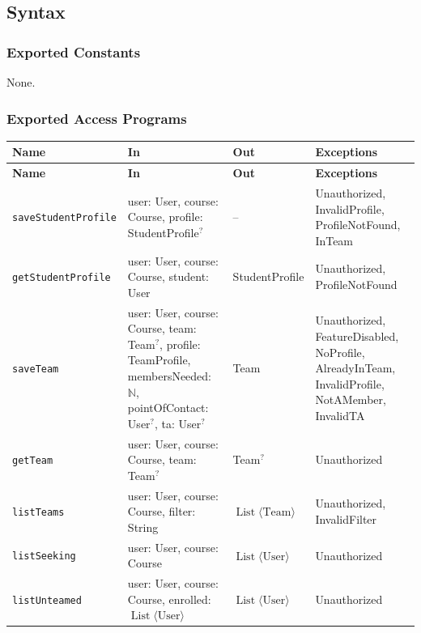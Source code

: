 \documentclass[12pt, titlepage]{article}
\begin{document}
\subsection{Syntax}

\subsubsection{Exported Constants}
None.

\subsubsection{Exported Access Programs}

\begingroup
\small
\setlength{\tabcolsep}{4pt}
\renewcommand{\arraystretch}{1.2}
\begin{longtable}{>{\raggedright\arraybackslash}p{}
                  >{\raggedright\arraybackslash}p{}
                  >{\raggedright\arraybackslash}p{}
                  >{\raggedright\arraybackslash}p{}}
\toprule
\textbf{Name} & \textbf{In} & \textbf{Out} & \textbf{Exceptions} \\
\midrule
\endfirsthead
\toprule
\textbf{Name} & \textbf{In} & \textbf{Out} & \textbf{Exceptions} \\
\midrule
\endhead
\endfoot
\texttt{saveStudentProfile} & user: User, course: Course, profile: StudentProfile$^{?}$ & -- & Unauthorized, InvalidProfile, ProfileNotFound, InTeam \\
\texttt{getStudentProfile} & user: User, course: Course, student: User & StudentProfile & Unauthorized, ProfileNotFound \\
\texttt{saveTeam} & user: User, course: Course, team: Team$^{?}$, profile: TeamProfile, membersNeeded: $\mathbb{N}$, pointOfContact: User$^{?}$, ta: User$^{?}$ & Team & Unauthorized, FeatureDisabled, NoProfile, AlreadyInTeam, InvalidProfile, NotAMember, InvalidTA \\
\texttt{getTeam} & user: User, course: Course, team: Team$^{?}$ & Team$^{?}$ & Unauthorized \\
\texttt{listTeams} & user: User, course: Course, filter: String & $\operatorname{List}\langle\text{Team}\rangle$ & Unauthorized, InvalidFilter \\
\texttt{listSeeking} & user: User, course: Course & $\operatorname{List}\langle\text{User}\rangle$ & Unauthorized \\
\texttt{listUnteamed} & user: User, course: Course, enrolled: $\operatorname{List}\langle\text{User}\rangle$ & $\operatorname{List}\langle\text{User}\rangle$ & Unauthorized \\

\end{longtable}
\end{document}

